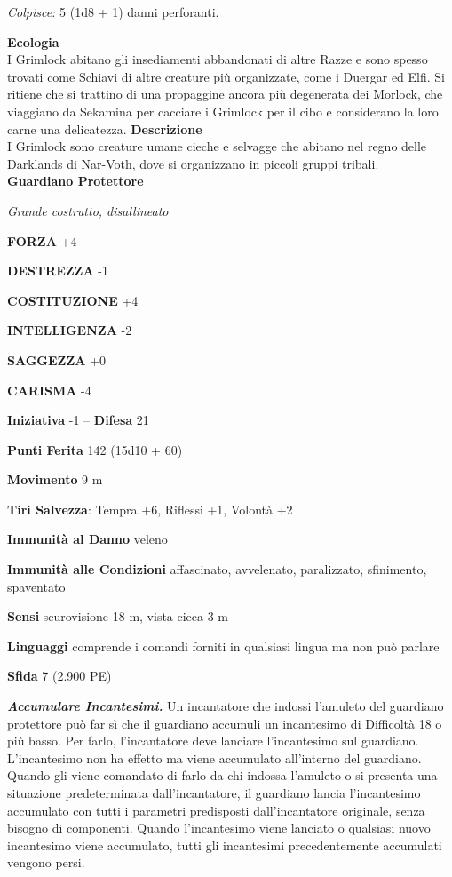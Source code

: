 \begin{multicols}{2}
\emph{Colpisce:} 5 (1d8 + 1) danni perforanti.

\textbf{Ecologia}\\
I Grimlock abitano gli insediamenti abbandonati di altre Razze e sono spesso trovati come Schiavi di altre creature più organizzate, come i Duergar ed Elfi. Si ritiene che si trattino di una propaggine ancora più degenerata dei Morlock, che viaggiano da Sekamina per cacciare i Grimlock per il cibo e considerano la loro carne una delicatezza.
\textbf{Descrizione}\\
I Grimlock sono creature umane cieche e selvagge che abitano nel regno delle Darklands di Nar-Voth, dove si organizzano in piccoli gruppi tribali.\\


\medskip{}\textbf{Guardiano Protettore}

\emph{Grande costrutto, disallineato}

\textbf{FORZA} +4

\textbf{DESTREZZA} -1

\textbf{COSTITUZIONE} +4

\textbf{INTELLIGENZA} -2

\textbf{SAGGEZZA} +0

\textbf{CARISMA} -4

\textbf{Iniziativa} -1 -- \textbf{Difesa} 21

\textbf{Punti Ferita} 142 (15d10 + 60)

\textbf{Movimento} 9 m

\textbf{Tiri Salvezza}: Tempra +6, Riflessi +1, Volontà +2

\textbf{Immunità al Danno} veleno

\textbf{Immunità alle Condizioni} affascinato, avvelenato, paralizzato, sfinimento, spaventato

\textbf{Sensi} scurovisione 18 m, vista cieca 3 m

\textbf{Linguaggi} comprende i comandi forniti in qualsiasi lingua ma non può parlare

\textbf{Sfida} 7 (2.900 PE)

\emph{\textbf{Accumulare Incantesimi.}} Un incantatore che indossi l'amuleto del guardiano protettore può far sì che il guardiano accumuli un incantesimo di Difficoltà 18 o più basso. Per farlo, l'incantatore deve lanciare l'incantesimo sul guardiano. L'incantesimo non ha effetto ma viene accumulato all'interno del guardiano. Quando gli viene comandato di farlo da chi indossa l'amuleto o si presenta una situazione predeterminata dall'incantatore, il guardiano lancia l'incantesimo accumulato con tutti i parametri predisposti dall'incantatore originale, senza bisogno di componenti. Quando l'incantesimo viene lanciato o qualsiasi nuovo incantesimo viene accumulato, tutti gli incantesimi precedentemente accumulati vengono persi.


\end{multicols}
